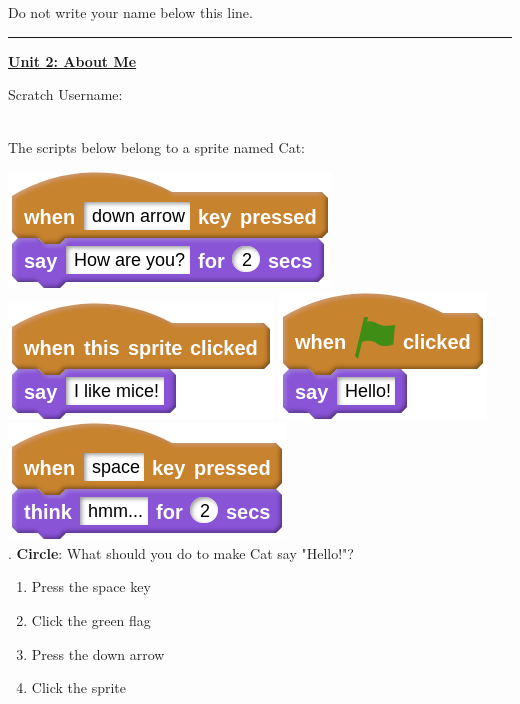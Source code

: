 \documentclass[letterpaper,12pt]{article}
\begin{document}
\noindent Do not write your name below this line. \\
\noindent \hrule
\begin{center}
{\Large \textbf{\underline{Unit 2: About Me}}}
\end{center}
Scratch Username: 

\noindent \dotfill \\

\noindent The scripts below belong to a sprite named Cat:

\includegraphics[scale=.4]{q1_script0.png} \hspace{1cm}
\includegraphics[scale=.4]{q1_script1.png} \hspace{1cm}
\includegraphics[scale=.4]{q1_script2.png} \hspace{1cm}
\includegraphics[scale=.4]{q1_script3.png} \\


. \textbf{Circle}: What should you do to make Cat say "Hello!"?
\renewcommand{\theenumi}{\Alph{enumi}}
\begin{enumerate}
\item Press the space key
\item Click the green flag
\item Press the down arrow
\item Click the sprite
\end{enumerate}
\end{document}
